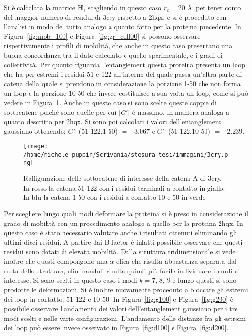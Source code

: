 Si è calcolata la matrice $ \mathbf{H} $, scegliendo in questo caso $ r_{c} = 20$ \AA \, per tener conto del maggior numero di residui di 3cry rispetto a 2hqx, e si è proceduto con l'analisi in modo del tutto analogo a quanto fatto per la proteina precedente. In Figura~\ref{fig:mob_100} e Figura~\ref{fig:gr_coll00} si possono osservare rispettivamente i profili di mobilità, che anche in questo caso presentano una buona concordanza tra il dato calcolato e quello sperimentale, e i gradi di collettività. Per quanto riguarda l'entanglement questa proteina presenta un loop che ha per estremi i residui 51 e 122 all'interno del quale passa un'altra parte di catena della quale si prendono in considerazione la porzione 1-50 che non forma un loop e la porzione 10-50 che invece costituisce a sua volta un loop, come si può vedere in Figura~\ref{fig:3cry}. Anche in questo caso si sono scelte queste coppie di sottocatene poiché sono quelle per cui $ \lvert G'\rvert $ è massimo, in maniera analoga a quanto descritto per 2hqx. Si sono poi calcolati i valori dell'entanglement gaussiano ottenendo: $ G' $~(51-122,1-50) $ = -3.067 $ e $ G' $~(51-122,10-50) $ = -2.239 $.
\begin{figure}[h]
	\centering
	\texttt{[image: /home/michele\_puppin/Scrivania/stesura\_tesi/immagini/3cry.png]}
	\caption{Raffigurazione delle sottocatene di interesse della catena A di 3cry. In rosso la catena 51-122 con i residui terminali a contatto in giallo. In blu la catena 1-50 con i residui a contatto 10 e 50 in verde}
	\label{fig:3cry}
\end{figure}

Per scegliere lungo quali modi deformare la proteina si è preso in considerazione il grado di mobilità con un procedimento analogo a quello per la proteina 2hqx. In questo caso è stato necessario valutare anche i risultati ottenuti eliminando gli ultimi dieci residui. A partire dai B-factor è infatti possibile osservare che questi residui sono dotati di elevata mobilità. Dalla struttura tridimensionale si vede inoltre che questi compongono una $ \alpha $-elica che risulta abbastanza separata dal resto della struttura, eliminandoli risulta quindi più facile individuare i modi di interesse. 
Si sono scelti in questo caso i modi  $ k=7, \, 8, \, 9 $ e lungo questi si sono prodotte le deformazioni. 
Si è inoltre nuovamente proceduto a bloccare gli estremi dei loop in contatto, 51-122 e 10-50.
In Figura~\ref{fig:g100} e Figura~\ref{fig:g200} è possibile osservare l'andamento dei valori dell'entanglement gaussiano per i tre modi scelti e nelle varie configurazioni. L'andamento delle distanze fra gli estremi dei loop può essere invece osservato in Figura~\ref{fig:d100} e Figura~\ref{fig:d200}.

